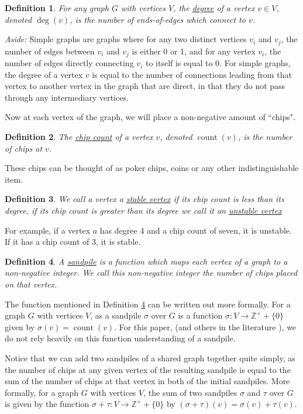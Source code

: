 \documentclass[12pt]{article}
\DeclareMathOperator{\ct}{count}
\DeclareMathOperator{\dg}{deg}
\newtheorem{definition}{Definition}
\begin{document}
\begin{definition}
    For any graph $G$ with vertices $V$, the \underline{degree} of a vertex $v \in V$, denoted $\dg(v)$, is the number of ends-of-edges which connect to $v$. \cite{levine}
\end{definition}

\textit{Aside:}  Simple graphs are graphs where for any two distinct vertices $v_i$ and $v_j$, the number of edges between $v_i$ and $v_j$ is either 0 or 1, and for any vertex $v_i$, the number of edges directly connecting $v_i$ to itself is equal to 0.  For simple graphs, the degree of a vertex $v$ is equal to the number of connections leading from that vertex to another vertex in the graph that are direct, in that they do not pass through any intermediary vertices.

Now at each vertex of the graph, we will place a non-negative amount of ``chips".
\begin{definition}
    The \underline{chip count} of a vertex $v$, denoted $\ct(v)$, is the number of chips at $v$.
\end{definition}

These chips can be thought of as poker chips, coins or any other indistinguishable item.  

\begin{definition}
    We call a vertex a \underline{stable vertex} if its chip count is less than its degree, if its chip count is greater than its degree we call it an \underline{unstable vertex} \cite{levine}
\end{definition}
For example, if a vertex $a$ has degree 4 and a chip count of seven, it is unstable.  If it has a chip count of 3, it is stable. 

\begin{definition} \label{def:sandpile}
    A \underline{sandpile} is a function which maps each vertex of a graph to a non-negative integer.  We call this non-negative integer the number of chips placed on that vertex. \cite{levine}
\end{definition}

The function mentioned in Definition \ref{def:sandpile} can be written out more formally.  For a graph $G$ with vertices $V$, as a sandpile $\sigma$ over $G$ is a function $\sigma: V \to \mathbb{Z}^+ + \{0\}$ given by $\sigma(v) = \ct(v)$.  For this paper, (and others in the literature \cite{levine}), we do not rely heavily on this function understanding of a sandpile. 

Notice that we can add two sandpiles of a shared graph together quite simply, as the number of chips at any given vertex of the resulting sandpile is equal to the sum of the number of chips at that vertex in both of the initial sandpiles.  More formally, for a graph $G$ with vertices $V$, the sum of two sandpiles $\sigma$ and $\tau$ over $G$ is given by the function $\sigma + \tau: V \to \mathbb{Z}^+ + \{0\}$ by $(\sigma + \tau)(v) = \sigma(v) + \tau(v)$.
\end{document}
